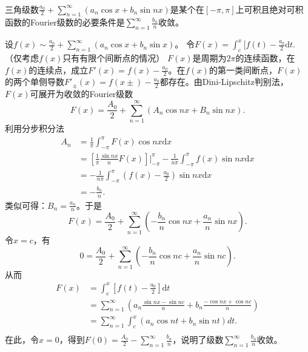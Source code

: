   \begin{exercise}
  \hfill\\
 三角级数$\displaystyle\frac{a_0}2+\sum_{n=1}^{\infty}(a_n\cos x+b_n\sin nx)$是某个在$[-\pi,\pi]$上可积且绝对可积函数的Fourier级数的必要条件是$\displaystyle\sum_{n=1}^{\infty}\frac{b_n}n$收敛。  
  
  设$f(x)\sim\frac{a_0}{2}+\sum_{n=1}^{\infty}(a_n\cos x+b_n\sin x)$。
  令$F(x)=\int_c^x[f(t)-\frac{a_0}{2}\mathrm{d}t.$（仅考虑$f(x)$只有有限个间断点的情况）
  $F(x)$是周期为$2\pi$的连续函数，在$f(x)$的连续点，成立$F'(x)=f(x)-\frac{a_0}{2}$。在$f(x)$的第一类间断点，$F(x)$的两个单侧导数$F'_{\pm}(x)=f(x\pm)-\frac{a_0}{2}$都存在。由Dini-Lipschitz判别法，$F(x)$可展开为收敛的Fourier级数$$F(x)=\frac{A_0}{2}+\sum_{n=1}^{\infty}(A_n\cos nx+B_n\sin nx).$$
  利用分步积分法
  \begin{align*}
  A_n&=\frac{1}{\pi}\int_{-\pi}^{\pi}F(x)\cos nx\mathrm{d}x\\
  &=[\frac{1}{\pi}\frac{\sin nx}{n}F(x)]|_{-\pi}^{\pi}-\frac{1}{n\pi}\int_{-\pi}^{\pi}f(x)\sin nx\mathrm{d}x\\
  &=-\frac{1}{n\pi}\int_{-\pi}^{\pi}(f(x)-\frac{a_0}{2})\sin nx\mathrm{d}x\\
  &=-\frac{b_n}{n}.
  \end{align*}
  类似可得：$B_n=\frac{a_n}{n}$。于是$$F(x)=\frac{A_0}{2}+\sum_{n=1}^{\infty}(-\frac{b_n}{n}\cos nx+\frac{a_n}{n}\sin nx).$$
  令$x=c$，有
  $$0=\frac{A_0}{2}+\sum_{n=1}^{\infty}(-\frac{b_n}{n}\cos nc+\frac{a_n}{n}\sin nc).$$
  从而
  \begin{align*}
  F(x)&=\int_c^x[f(t)-\frac{a_0}{2}]\mathrm{d}t\\
  &=\sum_{n=1}^{\infty}(a_n\frac{\sin nx-\sin nc}{n}+b_n\frac{-\cos nx+\cos nc}{n})\\
  &=\sum_{n=1}^{\infty}\int_c^x(a_n\cos nt+b_n\sin nt)dt.\\
  \end{align*}
  在此，令$x=0$，得到$F(0)=\frac{A_0}{2}-\sum_{n=1}^{\infty}\frac{b_n}{n}$，说明了级数$\sum_{n=1}^{\infty}\frac{b_n}{n}$收敛。  
  \end{exercise}
  \begin{exercise}
  \hfill\\
  
  
  
  \end{exercise}
  
   \begin{exercise}
  \hfill\\
  
  
  
  \end{exercise}
  
